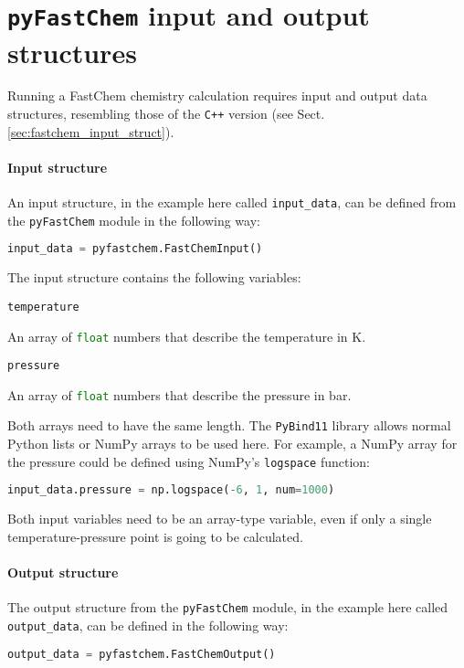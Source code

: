 \documentclass[numbers=noenddot]{fcmanual}
\newcommand{\pfc}{\texttt{pyFastChem}\xspace}
\newcommand{\cpp}{\ttt{C++}\xspace}
\newcommand{\pb}{\texttt{PyBind11}\xspace}
\newcommand{\ttt}[1]{\texttt {#1}}
\begin{document}
\section{\pfc input and output structures}
\label{sec:pfc_input_ouput_struct}

Running a FastChem chemistry calculation requires input and output data structures, resembling those of the \cpp version (see Sect. \ref{sec:fastchem_input_struct}). 

\paragraph{Input structure}
An input structure, in the example here called \lstinline!input_data!, can be defined from the \pfc module in the following way:
\begin{lstlisting}[language=Python]
  input_data = pyfastchem.FastChemInput()
\end{lstlisting}

The input structure contains the following variables:

\bigbreak

\lstinline[language=Python]!temperature!
\begin{addmargin}[25pt]{0pt}
	An array of \lstinline[language=Python]!float! numbers that describe the temperature in K.
\end{addmargin}

\bigbreak

\lstinline[language=Python]!pressure!
\begin{addmargin}[25pt]{0pt}
	An array of \lstinline[language=Python]!float! numbers that describe the pressure in bar.
\end{addmargin}

\bigbreak

Both arrays need to have the same length. The \pb library allows normal Python lists or NumPy arrays to be used here. For example, a NumPy array for the pressure could be defined using NumPy's \lstinline!logspace! function:

\begin{lstlisting}[language=Python]
  input_data.pressure = np.logspace(-6, 1, num=1000)
\end{lstlisting}
Both input variables need to be an array-type variable, even if only a single temperature-pressure point is going to be calculated.

\paragraph{Output structure}
The output structure from the \pfc module, in the example here called \lstinline!output_data!, can be defined in the following way:
\begin{lstlisting}[language=Python]
  output_data = pyfastchem.FastChemOutput()
\end{lstlisting}
\end{document}
